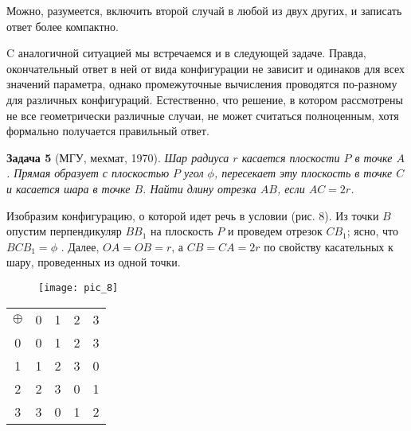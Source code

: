 Можно, разумеется, включить второй случай в любой из двух других, и записать ответ более компактно.

C аналогичной ситуацией мы встречаемся и в следующей задаче. Правда, окончательный ответ в ней от вида конфигурации не зависит и одинаков для всех значений параметра, однако промежуточные вычисления проводятся по-разному для различных конфигураций. Естественно, что решение, в котором рассмотрены не все геометрически различные случаи, не может считаться полноценным, хотя формально получается правильный ответ.


\textbf{Задача 5} (МГУ, мехмат, 1970). \textit{Шар радиуса $r$ касается плоскости $P$ в точке $A$. Прямая образует с плоскостью $P$ угол $\phi$, пересекает эту плоскость в точке $C$ и касается шара в точке $B$. Найти длину отрезка $AB$, если $AC = 2r$.}


Изобразим конфигурацию, о которой идет речь в условии (рис. 8). Из точки $B$ опустим перпендикуляр $BB_1$ на плоскость $P$ и проведем отрезок $CB_1$; ясно, что $BCB_1 = \phi$ . Далее, $OA = OB = r$, а $CB = CA =2r$ по свойству касательных к шару, проведенных из одной точки. 
\begin{figure}[h]
	\centering
	\texttt{[image: pic\_8]}
	\caption{}
	\label{fig:circle}
\end{figure}
\newpage

\begin{tabular}{c|c|c|c|c|}
    \multicolumn{1}{l}{$\oplus$} & \multicolumn{1}{l}{0} & \multicolumn{1}{l}{1} & \multicolumn{1}{l}{2} & \multicolumn{1}{l}{3} \\
    \cline{2-5}
    0 & 0 & 1 & 2 & 3 \\
    \cline{2-5}
    1 & 1 & 2 & 3 & 0 \\
    \cline{2-5}
    2 & 2 & 3 & 0 & 1 \\
    \cline{2-5}
    3 & 3 & 0 & 1 & 2 \\
    \cline{2-5}
  \end{tabular}



